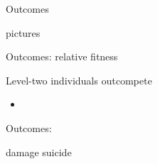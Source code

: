 \begin{frame}{Outcomes}

pictures

\end{frame}

\begin{frame}{Outcomes: relative fitness}

Level-two individuals outcompete

\begin{itemize}

\item

\end{itemize}

\end{frame}


\begin{frame}{Outcomes: }

damage suicide

\end{frame}
